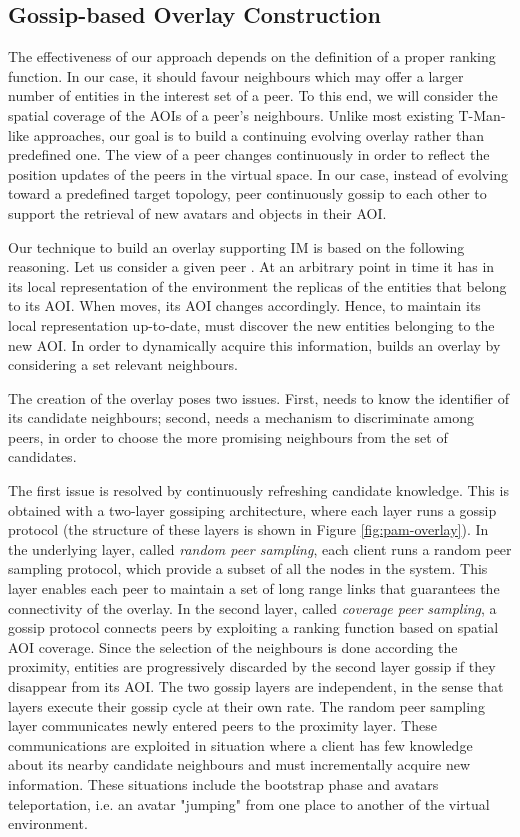 \documentclass[final,10pt,a5paper]{phdimt}
\theoremstyle{definition}
\begin{document}
\subsection{Gossip-based Overlay Construction}

The effectiveness of our approach depends on the definition of a proper ranking function. In our case,
it should favour neighbours which may offer a larger number of entities in the interest set of a peer. To this end,
we will consider the spatial coverage of the AOIs of a peer's neighbours.
Unlike most existing T-Man-like approaches, our goal is to build a continuing evolving overlay rather than predefined one. The view of a peer changes continuously in order to reflect the position updates of the peers in the virtual space. In our case, instead of evolving toward a predefined target topology, peer continuously gossip to each other to support the retrieval of new avatars and objects in their AOI.


Our technique to build an overlay supporting IM is based on the following reasoning. 
Let us consider a given peer .
At an arbitrary point in time it has in its local representation of the environment the replicas of the entities that belong to its AOI. 
When  moves, its AOI changes accordingly.
Hence, to maintain its local representation up-to-date,  must discover the new entities belonging to the new AOI.
In order to dynamically acquire this information,  builds an overlay by considering a set relevant neighbours. 

The creation of the overlay poses two issues.
First,  needs to know the identifier of its candidate neighbours; 
second,  needs a mechanism to discriminate among peers, in order to choose the more
promising neighbours from the set of candidates.

The first issue is resolved by continuously refreshing candidate knowledge.
This is obtained with a two-layer gossiping architecture, where each layer runs a gossip protocol (the structure of these layers is shown in Figure \ref{fig:pam-overlay}).
In the underlying layer, called \textit{random peer sampling}, each client runs a random peer sampling protocol, which provide a subset of all the nodes in the system.
This layer enables each peer to maintain a set of long range links that guarantees the connectivity of the overlay.
In the second layer, called \textit{coverage peer sampling}, a gossip protocol connects peers by exploiting a ranking function based on spatial AOI coverage. 
Since the selection of the neighbours is done according the proximity, entities are progressively discarded by the second layer gossip if they disappear from its AOI. 
The two gossip layers are independent, in the sense that layers execute their gossip cycle at their own rate.
The random peer sampling layer communicates newly entered peers to the proximity layer. 
These communications are exploited in situation where a client has few knowledge about its nearby candidate
neighbours and must incrementally acquire new information.
These situations include the bootstrap phase and avatars teleportation, i.e. an avatar "jumping" from one place to another of the virtual environment.
\end{document}
